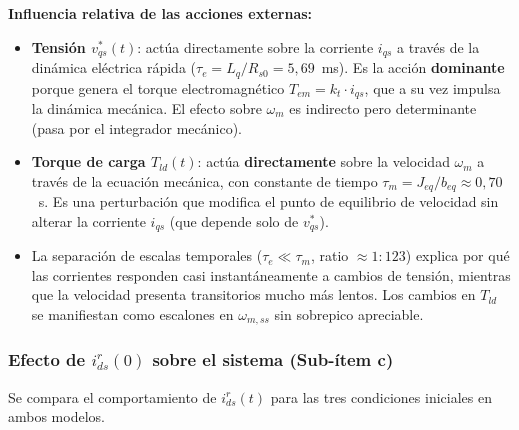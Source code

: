 \textbf{Influencia relativa de las acciones externas:}

\begin{itemize}
    \item \textbf{Tensión $v_{qs}^*(t)$}: actúa directamente sobre la corriente $i_{qs}$ a través de la dinámica eléctrica rápida ($\tau_e = L_q/R_{s0} = 5{,}69$~ms). Es la acción \textbf{dominante} porque genera el torque electromagnético $T_{em} = k_t \cdot i_{qs}$, que a su vez impulsa la dinámica mecánica. El efecto sobre $\omega_m$ es indirecto pero determinante (pasa por el integrador mecánico).

    \item \textbf{Torque de carga $T_{ld}(t)$}: actúa \textbf{directamente} sobre la velocidad $\omega_m$ a través de la ecuación mecánica, con constante de tiempo $\tau_m = J_{eq}/b_{eq} \approx 0{,}70$~s. Es una perturbación que modifica el punto de equilibrio de velocidad sin alterar la corriente $i_{qs}$ (que depende solo de $v_{qs}^*$).

    \item La separación de escalas temporales ($\tau_e \ll \tau_m$, ratio $\approx 1:123$) explica por qué las corrientes responden casi instantáneamente a cambios de tensión, mientras que la velocidad presenta transitorios mucho más lentos. Los cambios en $T_{ld}$ se manifiestan como escalones en $\omega_{m,ss}$ sin sobrepico apreciable.
\end{itemize}

\subsubsection{Efecto de $i_{ds}^r(0)$ sobre el sistema (Sub-ítem c)}
\label{sec:sim_item_c}

Se compara el comportamiento de $i_{ds}^r(t)$ para las tres condiciones iniciales en ambos modelos.

%

